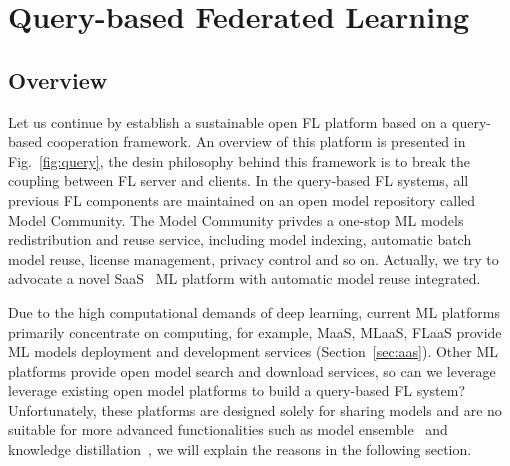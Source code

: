 \section{Query-based Federated Learning}
\label{sec:query}
\subsection{Overview}
Let us continue by establish a sustainable open FL platform based on a query-based cooperation framework.
An overview of this platform is presented in Fig.~\ref{fig:query}, the desin philosophy behind this framework is to break the coupling between FL server and clients.
In the query-based FL systems, all previous FL components are maintained on an open model repository called Model Community. The Model Community privdes a one-stop ML models redistribution and reuse service, including model indexing, automatic batch model reuse, license management, privacy control and so on.
Actually, we try to advocate a novel SaaS~\cite{brereton1999future} ML platform with automatic model reuse integrated. 

Due to the high computational demands of deep learning, current ML platforms primarily concentrate on computing, for example, MaaS, MLaaS, FLaaS provide ML models deployment and development services (Section~\ref{sec:aas}).
Other ML platforms provide open model search and download services, so can we leverage leverage existing open model platforms to build a query-based FL system?
Unfortunately, these platforms are designed solely for sharing models and are no suitable for more advanced functionalities such as model ensemble~\cite{jacobs1991adaptive} and knowledge distillation~\cite{hinton2015distilling}, we will explain the reasons in the following section.


